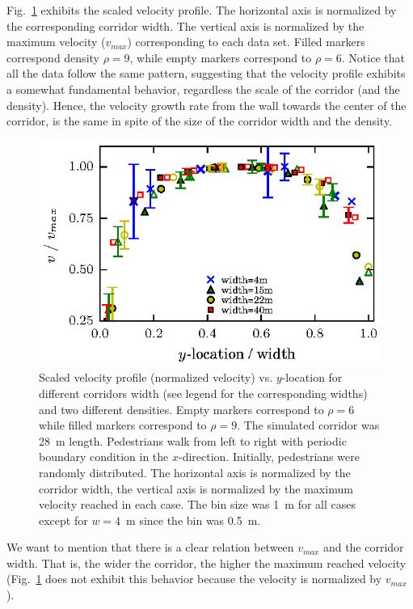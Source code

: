 \documentclass[preprint,12pt]{elsarticle}
\begin{document}
Fig.~\ref{speed-profile-width-normaliz} exhibits the scaled velocity profile. The horizontal axis is normalized by the corresponding corridor width. The vertical axis is normalized by the maximum velocity ($v_{max}$) corresponding to each data set. Filled markers correspond density $\rho=9$, while empty markers correspond to $\rho=6$. Notice that all the data follow the same  pattern, suggesting that the velocity profile exhibits a somewhat fundamental behavior, regardless the scale of the corridor (and the density). Hence, the velocity growth rate from the wall towards the center of the corridor, is the same in spite of the size of the corridor width and the density. \\

\begin{figure}[htbp!]
\centering
\includegraphics[width=0.7\columnwidth]
{./v_y_multi_width_normaliz.eps}
\caption{\label{speed-profile-width-normaliz} Scaled velocity profile (normalized velocity) vs. $y$-location for different corridors width (see legend for the corresponding widths) and two different densities. Empty markers correspond to $\rho=6$ while filled markers correspond to  $\rho=9$. The simulated corridor was 28~m length. Pedestrians walk from left to right with periodic boundary condition in the $x$-direction. Initially, pedestrians were randomly distributed. The horizontal axis is normalized by the corridor width, the vertical axis is normalized by the maximum velocity reached in each case.  The bin size was 1~m for all cases except for $w=4$~m since the bin was 0.5~m.}
\end{figure}

We want to mention that there is a clear relation between $v_{max}$ and the corridor width. That is, the wider the corridor, the higher the maximum reached velocity (Fig.~\ref{speed-profile-width-normaliz} does not exhibit this behavior because the velocity is normalized by $v_{max}$).\\
\end{document}
